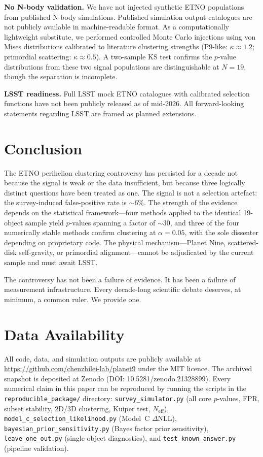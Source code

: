 \documentclass[12pt,a4paper]{article}
\begin{document}
\textbf{No N-body validation.} We have not injected synthetic ETNO populations from published N-body simulations. Published simulation output catalogues are not publicly available in machine-readable format. As a computationally lightweight substitute, we performed controlled Monte Carlo injections using von Mises distributions calibrated to literature clustering strengths (P9-like: $\kappa\approx1.2$; primordial scattering: $\kappa\approx0.5$). A two-sample KS test confirms the $p$-value distributions from these two signal populations are distinguishable at $N=19$, though the separation is incomplete.

\textbf{LSST readiness.} Full LSST mock ETNO catalogues with calibrated selection functions have not been publicly released as of mid-2026. All forward-looking statements regarding LSST are framed as planned extensions.

\section{Conclusion}

The ETNO perihelion clustering controversy has persisted for a decade not because the signal is weak or the data insufficient, but because three logically distinct questions have been treated as one. The signal is not a selection artefact: the survey-induced false-positive rate is $\sim$6\%. The strength of the evidence depends on the statistical framework---four methods applied to the identical 19-object sample yield $p$-values spanning a factor of $\sim$30, and three of the four numerically stable methods confirm clustering at $\alpha=0.05$, with the sole dissenter depending on proprietary code. The physical mechanism---Planet Nine, scattered-disk self-gravity, or primordial alignment---cannot be adjudicated by the current sample and must await LSST.

The controversy has not been a failure of evidence. It has been a failure of measurement infrastructure. Every decade-long scientific debate deserves, at minimum, a common ruler. We provide one.

\section*{Data Availability}
All code, data, and simulation outputs are publicly available at \url{https://github.com/chenzhilei-lab/planet9} under the MIT licence. The archived snapshot is deposited at Zenodo (DOI: 10.5281/zenodo.21328899). Every numerical claim in this paper can be reproduced by running the scripts in the \texttt{reproducible\_package/} directory: \texttt{survey\_simulator.py} (all core $p$-values, FPR, subset stability, 2D/3D clustering, Kuiper test, $N_\mathrm{eff}$), \texttt{model\_c\_selection\_likelihood.py} (Model~C $\Delta$NLL), \texttt{bayesian\_prior\_sensitivity.py} (Bayes factor prior sensitivity), \texttt{leave\_one\_out.py} (single-object diagnostics), and \texttt{test\_known\_answer.py} (pipeline validation).
\end{document}
